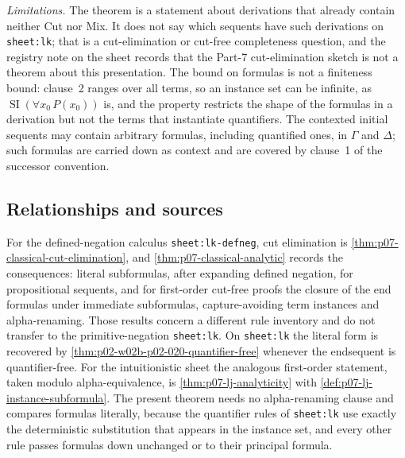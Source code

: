 \emph{Limitations.}  The theorem is a statement about derivations that already
contain neither Cut nor Mix.  It does not say which sequents have such
derivations on \texttt{sheet:lk}; that is a cut-elimination
or cut-free completeness question, and the registry note on the sheet records
that the Part-7 cut-elimination sketch is not a theorem about this
presentation.  The bound on formulas is not a finiteness bound: clause~2
ranges over all terms, so an instance set can be infinite, as
\(\operatorname{SI}(\forall x_0\,P(x_0))\) is, and the property restricts the
shape of the formulas in a derivation but not the terms that instantiate
quantifiers.  The
contexted initial sequents may contain arbitrary formulas, including quantified
ones, in \(\Gamma\) and \(\Delta\); such formulas are carried down as context
and are covered by clause~1 of the successor convention.

\subsection{Relationships and sources}
\label{sec:p02-w02b-p02-020-relations}

For the defined-negation calculus \texttt{sheet:lk-defneg}, cut elimination
is \cref{thm:p07-classical-cut-elimination}, and
\cref{thm:p07-classical-analytic} records the consequences: literal
subformulas, after expanding defined negation, for propositional sequents, and
for first-order cut-free proofs the closure of the end formulas under immediate
subformulas, capture-avoiding term instances and alpha-renaming.  Those results
concern a different rule inventory and do not transfer to the primitive-negation
\texttt{sheet:lk}.  On \texttt{sheet:lk} the literal form is recovered by
\cref{thm:p02-w02b-p02-020-quantifier-free} whenever the endsequent is
quantifier-free.  For the intuitionistic sheet the analogous first-order
statement, taken modulo alpha-equivalence, is \cref{thm:p07-lj-analyticity}
with \cref{def:p07-lj-instance-subformula}.  The present theorem needs no
alpha-renaming clause and compares formulas literally, because the quantifier
rules of \texttt{sheet:lk} use exactly the deterministic substitution that
appears in the instance set, and every other rule passes formulas down
unchanged or to their principal formula.

